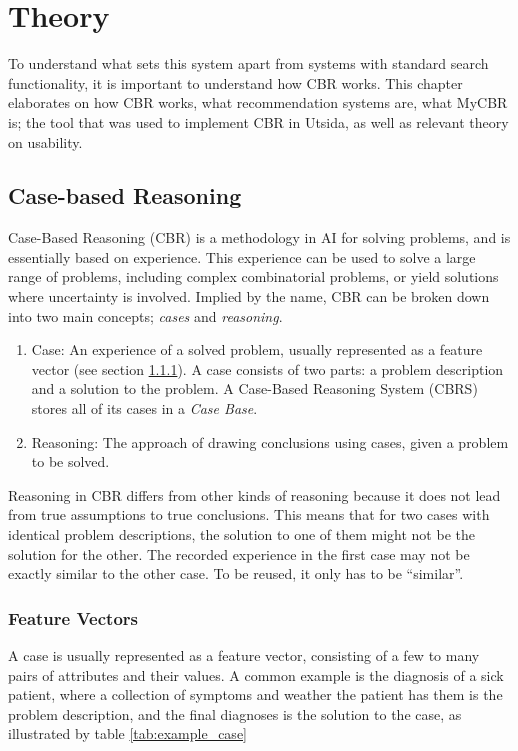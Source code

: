 \cleardoublepage

\chapter{Theory}

To understand what sets this system apart from systems with standard search functionality, it is important to understand how CBR works. This chapter elaborates on how CBR works, what recommendation systems are, what MyCBR is; the tool that was used to implement CBR in Utsida, as well as relevant theory on usability.


\section{Case-based Reasoning}
Case-Based Reasoning (CBR) is a methodology in AI for solving problems, and is essentially based on experience. This experience can be used to solve a large range of problems, including complex combinatorial problems, or yield solutions where uncertainty is involved. \cite{richter2013case} Implied by the name, CBR can be broken down into two main concepts; \textit{cases} and \textit{reasoning}.

\begin{enumerate}
    \item Case: An experience of a solved problem, usually represented as a feature vector (see section \ref{sec:feature_vectors}). A case consists of two parts: a problem description and a solution to the problem. A Case-Based Reasoning System (CBRS) stores all of its cases in a \textit{Case Base}.
    \item Reasoning: The approach of drawing conclusions using cases, given a problem to be solved.
\end{enumerate}

Reasoning in CBR differs from other kinds of reasoning because it does not lead from true assumptions to true conclusions. This means that for two cases with identical problem descriptions, the solution to one of them might not be the solution for the other. The recorded experience in the first case may not be exactly similar to the other case. To be reused, it only has to be \enquote{similar}.

\subsection{Feature Vectors}\label{sec:feature_vectors}
A case is usually represented as a feature vector, consisting of a few to many pairs of attributes and their values. A common example is the diagnosis of a sick patient, where a collection of symptoms and weather the patient has them is the problem description, and the final diagnoses is the solution to the case, as illustrated by table \ref{tab:example_case}



